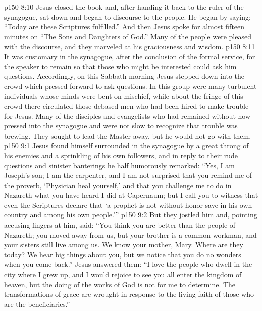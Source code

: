 \vs p150 8:10 Jesus closed the book and, after handing it back to the ruler of the synagogue, sat down and began to discourse to the people. He began by saying: \textcolor{ubdarkred}{“Today are these Scriptures fulfilled.”} And then Jesus spoke for almost fifteen minutes on \textcolor{ubdarkred}{“The Sons and Daughters of God.”} Many of the people were pleased with the discourse, and they marveled at his graciousness and wisdom.
\vs p150 8:11 It was customary in the synagogue, after the conclusion of the formal service, for the speaker to remain so that those who might be interested could ask him questions. Accordingly, on this Sabbath morning Jesus stepped down into the crowd which pressed forward to ask questions. In this group were many turbulent individuals whose minds were bent on mischief, while about the fringe of this crowd there circulated those debased men who had been hired to make trouble for Jesus. Many of the disciples and evangelists who had remained without now pressed into the synagogue and were not slow to recognize that trouble was brewing. They sought to lead the Master away, but he would not go with them.
\vs p150 9:1 Jesus found himself surrounded in the synagogue by a great throng of his enemies and a sprinkling of his own followers, and in reply to their rude questions and sinister banterings he half humorously remarked: \textcolor{ubdarkred}{“Yes, I am Joseph’s son; I am the carpenter, and I am not surprised that you remind me of the proverb, ‘Physician heal yourself,’ and that you challenge me to do in Nazareth what you have heard I did at Capernaum; but I call you to witness that even the Scriptures declare that ‘a prophet is not without honor save in his own country and among his own people.’”}
\vs p150 9:2 But they jostled him and, pointing accusing fingers at him, said: “You think you are better than the people of Nazareth; you moved away from us, but your brother is a common workman, and your sisters still live among us. We know your mother, Mary. Where are they today? We hear big things about you, but we notice that you do no wonders when you come back.” Jesus answered them: \textcolor{ubdarkred}{“I love the people who dwell in the city where I grew up, and I would rejoice to see you all enter the kingdom of heaven, but the doing of the works of God is not for me to determine. The transformations of grace are wrought in response to the living faith of those who are the beneficiaries.”}\plusone
